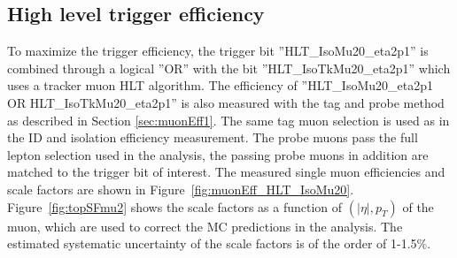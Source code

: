 \subsection{High level trigger efficiency}
\label{subsec:hlt}
To maximize the trigger efficiency, the trigger bit ''HLT\_IsoMu20\_eta2p1'' is combined through a logical ''OR'' with the bit ''HLT\_IsoTkMu20\_eta2p1'' which uses a tracker muon HLT algorithm. 
The efficiency of ''HLT\_IsoMu20\_eta2p1 OR HLT\_IsoTkMu20\_eta2p1'' is also measured with the tag and probe method as described in Section \ref{sec:muonEff1}. The same tag muon selection is used as in the ID and isolation efficiency measurement. The probe muons pass the full lepton selection  used in the analysis, the passing probe muons in addition are matched to the trigger bit of interest. The measured single muon efficiencies and scale factors are shown in Figure~\ref{fig:muonEff_HLT_IsoMu20}. Figure~\ref{fig:topSFmu2} shows the scale factors as a function of $(|\eta|,p_T)$ of the muon, which are used to correct the MC predictions in the analysis. The estimated systematic uncertainty of the scale factors is of the order of 1-1.5$\%$.

